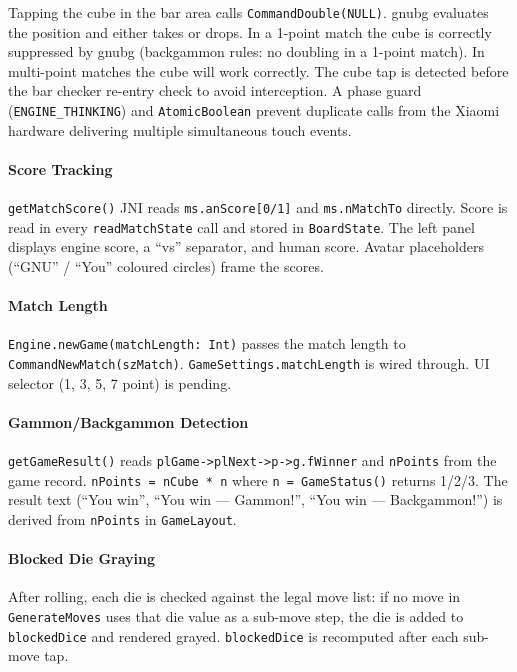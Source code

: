 \documentclass[11pt,a4paper]{article}
\begin{document}
Tapping the cube in the bar area calls \texttt{CommandDouble(NULL)}.
gnubg evaluates the position and either takes or drops. In a 1-point
match the cube is correctly suppressed by gnubg (backgammon rules: no
doubling in a 1-point match). In multi-point matches the cube will work
correctly. The cube tap is detected before the bar checker re-entry
check to avoid interception. A phase guard (\texttt{ENGINE\_THINKING})
and \texttt{AtomicBoolean} prevent duplicate calls from the Xiaomi
hardware delivering multiple simultaneous touch events.

\paragraph{Score Tracking}

\texttt{getMatchScore()} JNI reads \texttt{ms.anScore[0/1]} and
\texttt{ms.nMatchTo} directly. Score is read in every
\texttt{readMatchState} call and stored in \texttt{BoardState}. The
left panel displays engine score, a ``vs'' separator, and human score.
Avatar placeholders (``GNU'' / ``You'' coloured circles) frame the
scores.

\paragraph{Match Length}

\texttt{Engine.newGame(matchLength: Int)} passes the match length to
\texttt{CommandNewMatch(szMatch)}. \texttt{GameSettings.matchLength}
is wired through. UI selector (1, 3, 5, 7 point) is pending.

\paragraph{Gammon/Backgammon Detection}

\texttt{getGameResult()} reads \texttt{plGame->plNext->p->g.fWinner}
and \texttt{nPoints} from the game record. \texttt{nPoints = nCube * n}
where \texttt{n = GameStatus()} returns 1/2/3. The result text
(``You win'', ``You win --- Gammon!'', ``You win --- Backgammon!'')
is derived from \texttt{nPoints} in \texttt{GameLayout}.

\paragraph{Blocked Die Graying}

After rolling, each die is checked against the legal move list: if no
move in \texttt{GenerateMoves} uses that die value as a sub-move step,
the die is added to \texttt{blockedDice} and rendered grayed.
\texttt{blockedDice} is recomputed after each sub-move tap.
\end{document}
